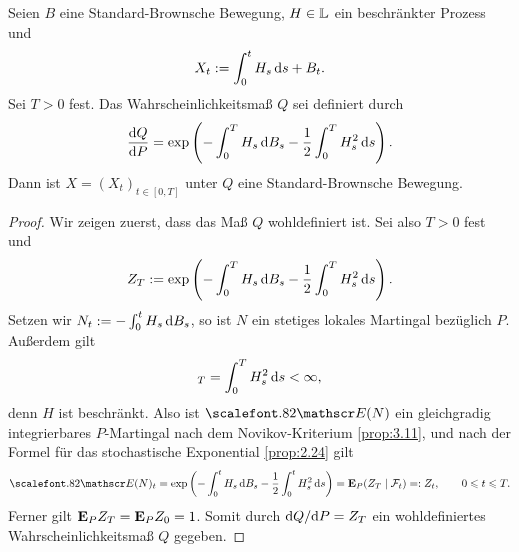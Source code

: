 \begin{theorem}
\label{prop:3.12}
Seien $B$ eine Standard-Brownsche Bewegung, $H\in\mathbb{L}$ ein beschränkter
Prozess und
\begin{align*}
X_t:= \int_0^t H_s \, \mathrm{d} s + B_t.
\end{align*}
Sei $T>0$ fest. Das Wahrscheinlichkeitsmaß $Q$ sei definiert durch
\begin{align*}
\frac{\mathrm{d} Q}{\mathrm{d} P} =
\exp \left( - \int_0^T H_s\,\mathrm{d} B_s - \frac{1}{2} \int_0^T H_s^2\,\mathrm{d} s\right).
\end{align*}
Dann ist $X=(X_t)_{t\in[0,T]}$ unter $Q$ eine Standard-Brownsche Bewegung.\fish
\end{theorem}
\begin{proof}
Wir zeigen zuerst, dass das Maß $Q$ wohldefiniert ist. Sei also $T > 0$ fest und
\begin{align*}
Z_T := \exp\left(-\int_0^T H_s\,\mathrm{d} B_s - \frac{1}{2} \int_0^T H_s^2\,\mathrm{d} s
\right).
\end{align*}
Setzen wir $N_t := -\int_0^t H_s\,\mathrm{d} B_s$, so ist $N$ ein stetiges lokales
Martingal bezüglich $P$. Außerdem gilt
\begin{align*}
[N,N]_T = \int_0^T H_s^2 \,\ds < \infty,
\end{align*}
denn $H$ ist beschränkt. Also ist $\Ep(N)$ ein gleichgradig integrierbares
$P$-Martingal nach dem Novikov-Kriterium \ref{prop:3.11}, und nach der Formel
für das stochastische Exponential \ref{prop:2.24} gilt
\begin{align*}
\Ep(N)_t = \exp\left(-\int_0^t H_s\,\dB_s - \frac{1}{2} \int_0^t H_s^2\,\ds
\right) = \E_P(Z_T\mid\FF_t)\defr Z_t,\qquad 0\le t\le T.
\end{align*}
Ferner gilt $\mathbf{E}_P Z_T = \mathbf{E}_P Z_0 = 1$.
Somit durch $\mathrm{d} Q/\mathrm{d} P = Z_T$ ein wohldefiniertes
Wahrscheinlichkeitsmaß $Q$ gegeben.



\end{proof}
